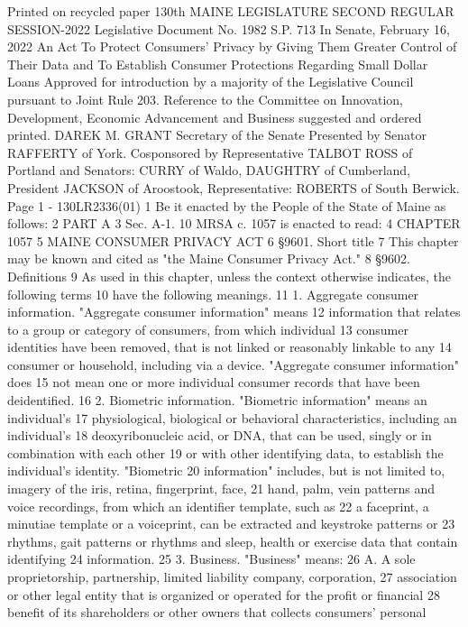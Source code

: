 Printed on recycled paper
130th MAINE LEGISLATURE
SECOND REGULAR SESSION-2022
Legislative Document No. 1982
S.P. 713 In Senate, February 16, 2022
An Act To Protect Consumers' Privacy by Giving Them Greater
Control of Their Data and To Establish Consumer Protections
Regarding Small Dollar Loans
Approved for introduction by a majority of the Legislative Council pursuant to Joint Rule
203.
Reference to the Committee on Innovation, Development, Economic Advancement and
Business suggested and ordered printed.
DAREK M. GRANT
Secretary of the Senate
Presented by Senator RAFFERTY of York.
Cosponsored by Representative TALBOT ROSS of Portland and
Senators: CURRY of Waldo, DAUGHTRY of Cumberland, President JACKSON of
Aroostook, Representative: ROBERTS of South Berwick.
Page 1 - 130LR2336(01)
1 Be it enacted by the People of the State of Maine as follows:
2 PART A
3 Sec. A-1. 10 MRSA c. 1057 is enacted to read:
4 CHAPTER 1057
5 MAINE CONSUMER PRIVACY ACT
6 §9601. Short title
7 This chapter may be known and cited as "the Maine Consumer Privacy Act."
8 §9602. Definitions
9 As used in this chapter, unless the context otherwise indicates, the following terms
10 have the following meanings.
11 1. Aggregate consumer information. "Aggregate consumer information" means
12 information that relates to a group or category of consumers, from which individual
13 consumer identities have been removed, that is not linked or reasonably linkable to any
14 consumer or household, including via a device. "Aggregate consumer information" does
15 not mean one or more individual consumer records that have been deidentified.
16 2. Biometric information. "Biometric information" means an individual's
17 physiological, biological or behavioral characteristics, including an individual's
18 deoxyribonucleic acid, or DNA, that can be used, singly or in combination with each other
19 or with other identifying data, to establish the individual's identity. "Biometric
20 information" includes, but is not limited to, imagery of the iris, retina, fingerprint, face,
21 hand, palm, vein patterns and voice recordings, from which an identifier template, such as
22 a faceprint, a minutiae template or a voiceprint, can be extracted and keystroke patterns or
23 rhythms, gait patterns or rhythms and sleep, health or exercise data that contain identifying
24 information.
25 3. Business. "Business" means:
26 A. A sole proprietorship, partnership, limited liability company, corporation,
27 association or other legal entity that is organized or operated for the profit or financial
28 benefit of its shareholders or other owners that collects consumers' personal
